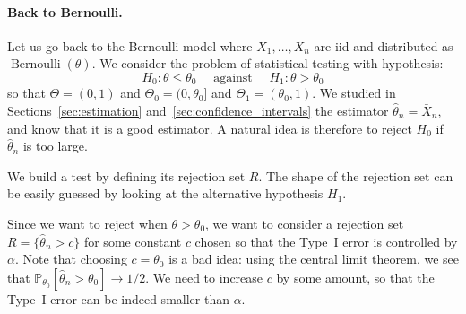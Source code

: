 \documentclass[
	fontsize=11pt, %
	twoside=false, %
	numbers=noenddot, %
]{kaobook}
\DeclareMathOperator{\ber}{Bernoulli}
\renewcommand{\P}{\mathbb P}
\newcommand{\wh}{\widehat}
\newcommand{\goes}{\rightarrow}
\begin{document}
\paragraph{Back to Bernoulli.} %

Let us go back to the Bernoulli model where $X_1, \ldots, X_n$ are iid and distributed as $\ber(\theta)$.
We consider the problem of statistical testing with hypothesis:
\begin{equation}
	\label{eq:chap03-tests-hypothesis}
	H_0 : \theta \leq \theta_0 \quad \text{ against } \quad H_1 : \theta > \theta_0
\end{equation}
so that $\Theta = (0, 1)$ and $\Theta_0 = (0, \theta_0]$ and $\Theta_1 = (\theta_0, 1)$.
We studied in Sections~\ref{sec:estimation} and~\ref{sec:confidence_intervals} the estimator $\wh \theta_n = \bar X_n$, and know that it is a good estimator.
A natural idea is therefore to reject $H_0$ if $\wh \theta_n$ is too large.
\begin{recipe}
	We build a test by defining its rejection set $R$. The shape of the rejection set can be easily guessed by looking at the alternative hypothesis $H_1$.
\end{recipe}
Since we want to reject when $\theta > \theta_0$, we want to consider a rejection set $R = \{ \wh \theta_n > c \}$ for some constant $c$ chosen so that the Type~I error is controlled by $\alpha$.
Note that choosing $c = \theta_0$ is a bad idea: using the central limit theorem, we see that $\P_{\theta_0}[\wh \theta_n > \theta_0] \goes 1/2$.
We need to increase $c$ by some amount, so that the Type~I error can be indeed smaller than $\alpha$.%
\end{document}
